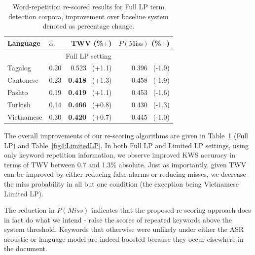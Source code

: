 \begin{table}
\centering
\begin{tabular}{l|l|r|r} \toprule
\bf Language & \bf $\widehat{\alpha}$ & \bf TWV (\%$\pm$) & \bf $P(\mathrm{Miss})$ (\%$\pm$) \\\midrule
\multicolumn{4}{c}{Full LP setting} \\\midrule
Tagalog & 0.20 & \textbf{0.523} $\,$ (+1.1) & 0.396 $\,$ (-1.9)\\
Cantonese & 0.23 & \textbf{0.418 }$\,$ (+1.3) & 0.458 $\,$ (-1.9) \\
Pashto & 0.19 & \textbf{0.419} $\,$ (+1.1) & 0.453 $\,$ (-1.6) \\
Turkish & 0.14 & \textbf{0.466} $\,$ (+0.8) & 0.430 $\,$ (-1.3) \\
Vietnamese & 0.30 & \textbf{0.420} $\,$ (+0.7) & 0.445 $\,$ (-1.0) \\
\bottomrule
\end{tabular}
\caption[Word-repetition re-scored results]{Word-repetition re-scored results for Full LP term detection corpora, improvement over baseline system denoted as percentage change. 
\label{fig4:FullLP} }
\end{table}


The overall improvements of our re-scoring algorithms are given in Table~\ref{fig4:FullLP} (Full LP) and Table~\ref{fig4:LimitedLP}.  In both Full LP and Limited LP settings, using only keyword repetition information, we observe improved KWS accuracy in terms of TWV between 0.7 and 1.3\% absolute.   Just as importantly, given TWV can be improved by either reducing false alarms or reducing misses, we decrease the miss probability in all but one condition (the exception being Vietnamese Limited LP).  

The reduction in $P(Miss)$ indicates that the proposed re-scoring approach does in fact do what we intend - raise the scores of repeated keywords above the system threshold.  Keywords that otherwise were unlikely under either the ASR acoustic or language model are indeed boosted because they occur elsewhere in the document.


